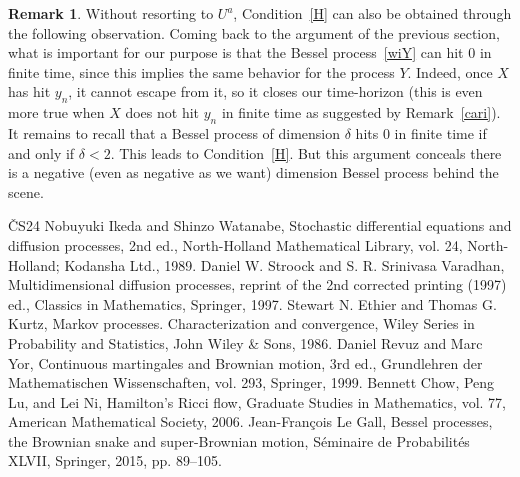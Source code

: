 \documentclass[10pt]{amsart}
\theoremstyle{definition}\newtheorem{defi}[theo]{Definition}\newtheorem{rema}[theo]{Remark}\newtheorem{exam}[theo]{Example}\newtheorem{exem}[theo]{Example}\newtheorem{nota}[theo]{Notation}
\begin{document}
\begin{rema}
Without resorting to $U^a$, Condition~\eqref{H} can also be obtained through the following observation. Coming back to the argument of the previous section, what is important for our purpose is that the Bessel process~\eqref{wiY} can hit 0 in finite time, since this implies the same behavior for the process $Y$. Indeed, once $X$ has hit $y_n$, it cannot escape from it, so it closes our time-horizon (this is even more true when $X$ does not hit $y_n$ in finite time as suggested by Remark~\ref{cari}). It remains to recall that a Bessel process of dimension $\delta$ hits 0 in finite time if and only if $\delta<2$. This leads to Condition~\eqref{H}. But this argument conceals there is a negative (even as negative as we want) dimension Bessel process behind the scene.
\end{rema}
\begin{thebibliography}{ČS24}
 Nobuyuki Ikeda and Shinzo Watanabe, Stochastic differential equations and diffusion processes, 2nd ed., North-Holland Mathematical Library, vol. 24, North-Holland; Kodansha Ltd., 1989.
 Daniel W. Stroock and S. R. Srinivasa Varadhan, Multidimensional diffusion processes, reprint of the 2nd corrected printing (1997) ed., Classics in Mathematics, Springer, 1997.
 Stewart N. Ethier and Thomas G. Kurtz, Markov processes. Characterization and convergence, Wiley Series in Probability and Statistics, John Wiley \& Sons, 1986.
 Daniel Revuz and Marc Yor, Continuous martingales and Brownian motion, 3rd ed., Grundlehren der Mathematischen Wissenschaften, vol. 293, Springer, 1999.
 Bennett Chow, Peng Lu, and Lei Ni, Hamilton’s Ricci flow, Graduate Studies in Mathematics, vol. 77, American Mathematical Society, 2006.
 Jean-François Le Gall, Bessel processes, the Brownian snake and super-Brownian motion, Séminaire de Probabilités XLVII, Springer, 2015, pp. 89–105.
\end{thebibliography}
\end{document}
